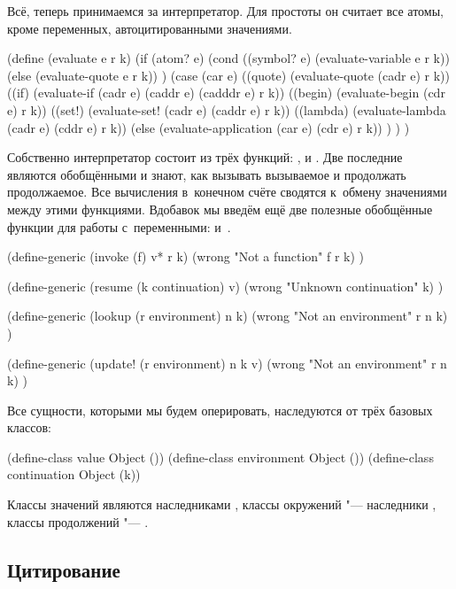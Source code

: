 Всё, теперь принимаемся за интерпретатор. Для простоты он считает все атомы,
кроме переменных, автоцитированными значениями.

\begin{code:lisp}
(define (evaluate e r k)
  (if (atom? e)
      (cond ((symbol? e) (evaluate-variable e r k))
            (else        (evaluate-quote e r k)) )
      (case (car e)
        ((quote)  (evaluate-quote (cadr e) r k))
        ((if)     (evaluate-if (cadr e) (caddr e) (cadddr e) r k))
        ((begin)  (evaluate-begin (cdr e) r k))
        ((set!)   (evaluate-set! (cadr e) (caddr e) r k))
        ((lambda) (evaluate-lambda (cadr e) (cddr e) r k))
        (else     (evaluate-application (car e) (cdr e) r k)) ) ) )
\end{code:lisp}

Собственно интерпретатор состоит из трёх функций: ,  и
. Две последние являются обобщёнными и знают, как вызывать вызываемое
и продолжать продолжаемое. Все вычисления в~конечном счёте сводятся к~обмену
значениями между этими функциями. Вдобавок мы введём ещё две полезные обобщённые
функции для работы с~переменными:  и~.

\begin{code:lisp}
(define-generic (invoke (f) v* r k)
  (wrong "Not a function" f r k) )

(define-generic (resume (k continuation) v)
  (wrong "Unknown continuation" k) )

(define-generic (lookup (r environment) n k)
  (wrong "Not an environment" r n k) )

(define-generic (update! (r environment) n k v)
  (wrong "Not an environment" r n k) )
\end{code:lisp}

Все сущности, которыми мы будем оперировать, наследуются от трёх базовых
классов:

\begin{code:lisp}
(define-class value        Object ())
(define-class environment  Object ())
(define-class continuation Object (k))
\end{code:lisp}

Классы значений являются наследниками , классы окружений "---
наследники , классы продолжений "--- .


\subsection{Цитирование}\label{escape/actors/ssect:quoting}

